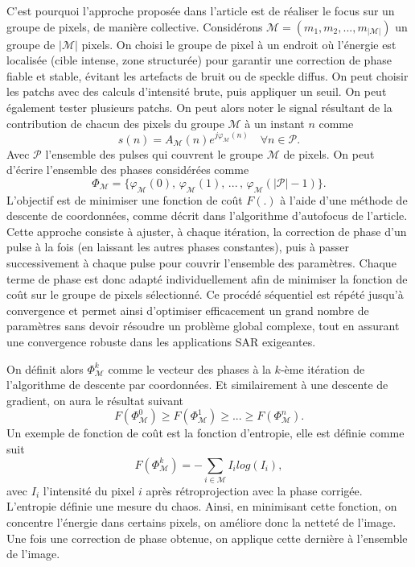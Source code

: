 C’est pourquoi l’approche proposée dans l’article est de réaliser le focus sur un groupe de pixels, de manière collective. 
Considérons $\mathcal{M} = (m_1, m_2, ..., m_{|\mathcal{M}|}) $ un groupe de $|\mathcal{M}|$ pixels.  On choisi le groupe de pixel à un endroit où l'énergie est localisée (cible intense, zone structurée) pour garantir une correction de phase fiable et stable, évitant les artefacts de bruit ou de speckle diffus. On peut choisir les patchs avec des calculs d'intensité brute, puis appliquer un seuil. On peut également tester plusieurs patchs. 
On peut alors noter le signal résultant de la contribution de chacun des pixels du groupe $\mathcal{M}$ à un instant $n$ comme 
\begin{equation}
    s(n) = A_{\mathcal{M}}(n) e^{j\varphi_{\mathcal{M}}(n)} \quad \forall n \in \mathcal{P}. 
\end{equation}
Avec $ \mathcal{P} $ l'ensemble des pulses qui couvrent le groupe $\mathcal{M}$ de pixels. 
On peut d'écrire l'ensemble des phases considérées comme 
\begin{equation}
    \Phi_{\mathcal{M}} = \{\varphi_{\mathcal{M}}(0), \,\varphi_{\mathcal{M}}(1), \,...\,,\,\varphi_{\mathcal{M}}(|\mathcal{P}| -1) \}.
\end{equation}
L’objectif est de minimiser une fonction de coût $F(.)$ à l’aide d’une méthode de descente de coordonnées, comme décrit dans l’algorithme d’autofocus de l’article. Cette approche consiste à ajuster, à chaque itération, la correction de phase d’un pulse à la fois (en laissant les autres phases constantes), puis à passer successivement à chaque pulse pour couvrir l’ensemble des paramètres. Chaque terme de phase est donc adapté individuellement afin de minimiser la fonction de coût sur le groupe de pixels sélectionné. Ce procédé séquentiel est répété jusqu’à convergence et permet ainsi d’optimiser efficacement un grand nombre de paramètres sans devoir résoudre un problème global complexe, tout en assurant une convergence robuste dans les applications SAR exigeantes. 

On définit alors $ \Phi^k_{\mathcal{M}}$ comme le vecteur des phases à la $k$-ème itération de l'algorithme de descente par coordonnées. Et similairement à une descente de gradient, on aura le résultat suivant 
\begin{equation}
    F(\Phi^0_{\mathcal{M}}) \geq F(\Phi^1_{\mathcal{M}}) \geq ... \geq F(\Phi^n_{\mathcal{M}}). 
\end{equation}
Un exemple de fonction de coût est la fonction d'entropie, elle est définie comme suit  
\begin{equation}
    F(\Phi^k_{\mathcal{M}}) = - \sum_{i\in \mathcal{M}}I_i log(I_i),  
\end{equation}
avec $I_i$ l'intensité du pixel $i$ après rétroprojection avec la phase corrigée. L'entropie définie une mesure du chaos. Ainsi, en minimisant cette fonction, on concentre l'énergie dans certains pixels, on améliore donc la netteté de l'image. Une fois une correction de phase obtenue, on applique cette dernière à l'ensemble de l'image. 

